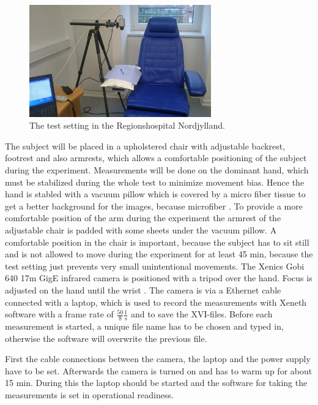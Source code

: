 \begin{figure}[H]
	\includegraphics[width=0.7\textwidth]{figures/setting}
	\caption{The test setting in the Regionshospital Nordjylland.}
	\label{fig:setting}
\end{figure}

The subject will be placed in a upholstered chair with adjustable backrest, footrest and also armrests, which allows a comfortable positioning of the subject during the experiment. Measurements will be done on the dominant hand, which must be stabilized during the whole test to minimize movement bias. Hence the hand is stabled with a vacuum pillow which is covered by a micro fiber tissue to get a better background for the images, because microfiber . To provide a more comfortable position of the arm during the experiment the armrest of the adjustable chair is padded with some sheets under the vacuum pillow. A comfortable position in the chair is important, because the subject has to sit still and is not allowed to move during the experiment for at least 45 min, because the test setting just prevents very small unintentional movements.
The Xenics Gobi 640 17\mu m GigE infrared camera is positioned with a tripod over the hand. Focus is adjusted on the hand until the wrist .
The camera is via a Ethernet cable connected with a laptop, which is used to record the measurements with Xeneth software with a frame rate of $ \frac{50}{8} \frac{1}{s} $ and to save the XVI-files. Before each measurement is started, a unique file name has to be chosen and typed in, otherwise the software will overwrite the previous file.

First the cable connections between the camera, the laptop and the power supply have to be set. Afterwards the camera is turned on and has to warm up for about 15 min. During this the laptop should be started and the software for taking the measurements is set in operational readiness. 

